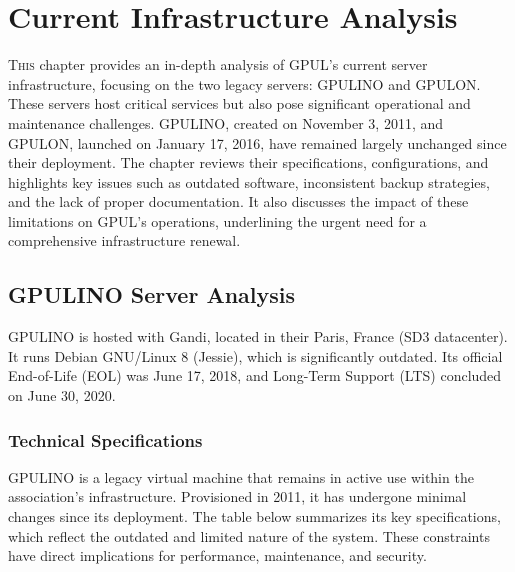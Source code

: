 %

\chapter{Current Infrastructure Analysis}
\label{chap:current-infrastructure}

\lettrine{T}{his} chapter provides an in-depth analysis of GPUL's current server infrastructure, focusing on the two legacy servers: GPULINO and GPULON. These servers host critical services but also pose significant operational and maintenance challenges. GPULINO, created on November 3, 2011, and GPULON, launched on January 17, 2016, have remained largely unchanged since their deployment. The chapter reviews their specifications, configurations, and highlights key issues such as outdated software, inconsistent backup strategies, and the lack of proper documentation. It also discusses the impact of these limitations on GPUL's operations, underlining the urgent need for a comprehensive infrastructure renewal.

\section{GPULINO Server Analysis}

GPULINO is hosted with Gandi, located in their Paris, France (SD3 datacenter). It runs Debian GNU/Linux 8 (Jessie), which is significantly outdated. Its official End-of-Life (EOL) was June 17, 2018, and Long-Term Support (LTS) concluded on June 30, 2020.

\subsection{Technical Specifications}

GPULINO is a legacy virtual machine that remains in active use within the association's infrastructure. Provisioned in 2011, it has undergone minimal changes since its deployment. The table below summarizes its key specifications, which reflect the outdated and limited nature of the system. These constraints have direct implications for performance, maintenance, and security.

